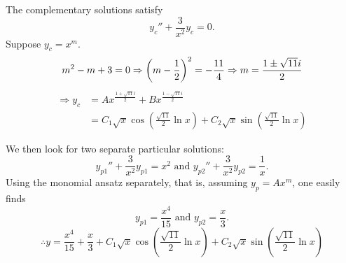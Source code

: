 \item
The complementary solutions satisfy
\[
	y_{c}'' + \frac{3}{x^2} y_c = 0.
\]
Suppose $y_c = x^m$.
\[
	m^2 - m  + 3 = 0
	\Rightarrow {\left( m - \frac{1}{2}\right)}^2 = -\frac{11}{4}
	\Rightarrow m = \frac{1 \pm \sqrt{11}i}{2}
\]
\begin{align*}
	\Rightarrow y_c
	&= A x^{\frac{1 + \sqrt{11}i}{2}} + B x^{\frac{1 - \sqrt{11}i}{2}} \\
	&= C_1 \sqrt{x} \cos \left( \frac{\sqrt{11}}{2} \ln x \right)
	 + C_2 \sqrt{x} \sin \left( \frac{\sqrt{11}}{2} \ln x \right)
\end{align*}

We then look for two separate particular solutions:
\[
	y_{p1}'' + \frac{3}{x^2} y_{p1} = x^2
	\text{ and }
	y_{p2}'' + \frac{3}{x^2} y_{p2} = \frac{1}{x}.
\]
Using the monomial ansatz separately, that is, assuming $y_p = Ax^m$, one easily finds
\[
	y_{p1} = \frac{x^4}{15}
	\text{ and }
	y_{p2} = \frac{x}{3}.
\]
\[
	\therefore y = \frac{x^4}{15} + \frac{x}{3}
	+ C_1 \sqrt{x} \cos \left( \frac{\sqrt{11}}{2} \ln x \right)
	+ C_2 \sqrt{x} \sin \left( \frac{\sqrt{11}}{2} \ln x \right)
\]
